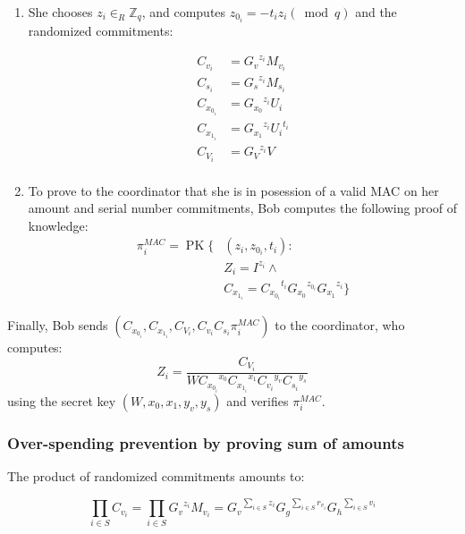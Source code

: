 \documentclass{article}
\begin{document}
\begin{enumerate}

\item She chooses
$z_i \in_{R} \mathbb{Z}_{q}$,
and computes 
$z_{0_i}=-{t_i} {z_i} (\bmod q)$
and the randomized commitments:

\begin{align*}
C_{v_i}     &= {G_v}^{z_i} M_{v_i} \\
C_{s_i}     &= {G_s}^{z_i} M_{s_i} \\
C_{x_{0_i}} &= {G_{x_0}}^{z_i} {U_i} \\
C_{x_{1_i}} &= {G_{x_1}}^{z_i} {U_i}^{t_i} \\
C_{V_i}     &= {G_V}^{z_i} V \\
\end{align*}

\item To prove to the coordinator that she is in posession of a valid MAC on her amount and serial number commitments, Bob computes the following proof of knowledge:
\begin{align*}
\pi_{i}^{\mathit{MAC}}=\operatorname{PK}\{
& (z_i, z_{0_i},t_i): \\
& Z_i =I^{z_i} \land \\ %
& C_{x_{1_i}} = {C_{x_{0_i}}}^{t_i} {G_{x_0}}^{z_{0_i}} {G_{x_1}}^{z_i}\}
\end{align*}
\end{enumerate}

Finally, Bob sends $(C_{x_{0_i}}, C_{x_{1_i}}, C_{V_i}, C_{v_i} C_{s_i} \pi_i^{\mathit{MAC}})$ to the coordinator, who computes:
\[
Z_i=\frac{C_{V_i}}{W {C_{x_{0_i}}}^{x_0} {C_{x_{1_i}}}^{x_{1}}
{C_{v_i}}^{y_v} {C_{s_i}}^{y_s} %
}
\]
using the secret key $(W, x_{0}, x_{1}, y_v, y_s)$ and verifies $\pi_i^{\mathit{MAC}}$.


\subsubsection{Over-spending prevention by proving sum of amounts}

The product of randomized commitments amounts to:

\[\prod_{i \in S} C_{{v_i}}
= \prod_{i \in S} {G_v}^{z_i}M_{v_i}
= {G_v}^{\sum_{i \in S} z_i}{G_g}^{\sum_{i \in S} r_{v_i}}{G_h}^{\sum_{i \in S} v_i}
\]
\end{document}
